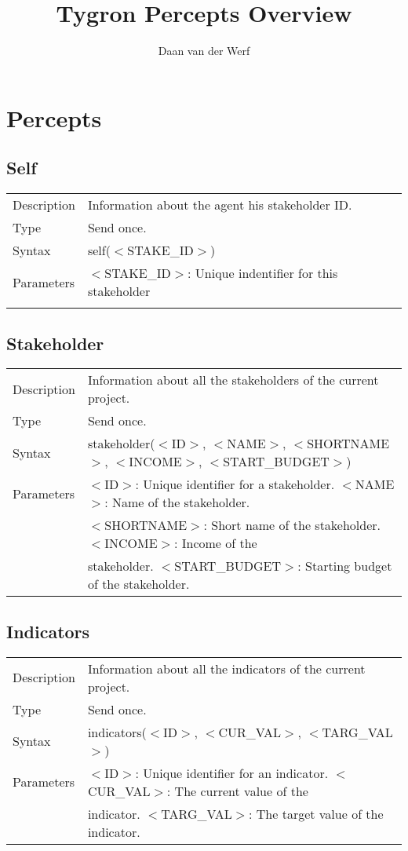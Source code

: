 \documentclass{article}
\author{Daan van der Werf}
\title{Tygron Percepts Overview}
\begin{document}
\maketitle{}
\newpage

\section*{Percepts}

\subsection*{Self}

\begin{tabular}{ l l }
  Description & Information about the agent his stakeholder ID.  \\
  Type & Send once. \\
  Syntax & self($<$STAKE\_ID$>$) \\
  Parameters & $<$STAKE\_ID$>$: Unique indentifier for this stakeholder\\\\

\end{tabular}

\subsection*{Stakeholder}

\begin{tabular}{ l l }
  Description & Information about all the stakeholders of the current project.  \\
  Type & Send once. \\
  Syntax & stakeholder($<$ID$>$, $<$NAME$>$, $<$SHORTNAME$>$, $<$INCOME$>$, $<$START\_BUDGET$>$) \\
  Parameters &  $<$ID$>$: Unique identifier for a stakeholder. $<$NAME$>$: Name of the stakeholder. \\
   & $<$SHORTNAME$>$: Short name of the stakeholder. $<$INCOME$>$: Income of the \\
   & stakeholder. $<$START\_BUDGET$>$: Starting budget of the stakeholder.
\end{tabular}

\subsection*{Indicators}

\begin{tabular}{ l l }
  Description & Information about all the indicators of the current project.  \\
  Type & Send once. \\
  Syntax & indicators($<$ID$>$, $<$CUR\_VAL$>$, $<$TARG\_VAL$>$) \\
  Parameters &  $<$ID$>$: Unique identifier for an indicator. $<$CUR\_VAL$>$: The current value of the \\
    & indicator. $<$TARG\_VAL$>$: The target value of the indicator. 
\end{tabular}
\end{document}
